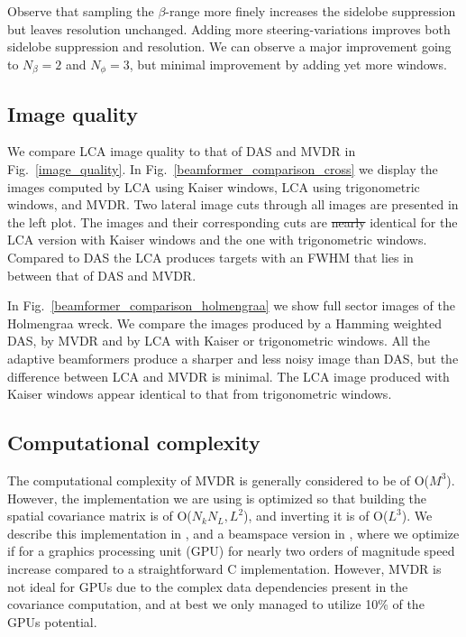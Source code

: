 \documentclass[10pt,journal,draftclsnofoot,onecolumn]{IEEEtran}
\newcommand\Fig[1]{Fig.~\ref{#1}}
\newcommand\1{\vec 1}
\providecommand{\DIFadd}[1]{{\protect\color{blue}\uwave{#1}}} %
\providecommand{\DIFdel}[1]{{\protect\color{red}\sout{#1}}}                      %
\providecommand{\DIFaddbegin}{} %
\providecommand{\DIFaddend}{} %
\providecommand{\DIFdelbegin}{} %
\providecommand{\DIFdelend}{} %
\begin{document}
Observe that sampling the $\beta$-range more finely increases the sidelobe suppression but leaves resolution unchanged. Adding more steering-variations improves both sidelobe suppression and resolution. We can observe a major improvement going to $N_\beta=2$ and $N_\phi=3$, but minimal improvement by adding yet more windows.


\subsection{Image quality}\label{sec:results_image_quality}

We compare LCA image quality to that of DAS and MVDR in \Fig{image_quality}. In \Fig{beamformer_comparison_cross} we display the images computed by LCA using Kaiser windows, LCA using trigonometric windows, and MVDR. Two lateral image cuts through all images are presented in the left plot. The images and their corresponding cuts are \DIFdelbegin \DIFdel{nearly }\DIFdelend \DIFaddbegin \DIFadd{near }\DIFaddend identical for the LCA version with Kaiser windows and the one with trigonometric windows. Compared to DAS the LCA produces targets with an FWHM that lies in between that of DAS and MVDR.

In \Fig{beamformer_comparison_holmengraa} we show full sector images of the Holmengraa wreck. We compare the images produced by a Hamming weighted DAS, by MVDR and by LCA with Kaiser or trigonometric windows. All the adaptive beamformers produce a sharper and less noisy image than DAS, but the difference between LCA and MVDR is minimal. The LCA image produced with Kaiser windows appear identical to that from trigonometric windows.


\subsection{Computational complexity}\label{sec:results_complexity}

The computational complexity of MVDR is generally considered to be of O($M^3$). However, the implementation we are using is optimized so that building the spatial covariance matrix is of O($N_kN_L,L^2$), and inverting it is of O($L^3$). We describe this implementation in \cite{Buskenes2014}, and a beamspace version in \cite{Asen2013}, where we optimize if for a graphics processing unit (GPU) for nearly two orders of magnitude speed increase compared to a straightforward C implementation. However, MVDR is not ideal for GPUs due to the complex data dependencies present in the covariance computation, and at best we only managed to utilize 10\% of the GPUs potential.
\end{document}
